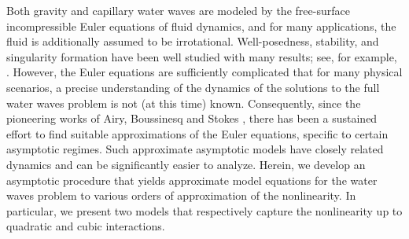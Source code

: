 \documentclass[11pt]{article}
\theoremstyle{plain}
\theoremstyle{definition}
\theoremstyle{definition}
\begin{document}
Both gravity and capillary 
water waves are modeled by the free-surface incompressible Euler equations of fluid dynamics, and for many applications,  the fluid is
additionally assumed to be  irrotational.  Well-posedness, stability, and  singularity formation have been well studied with many results;
 see, for example,  \cite{nalimov1974cauchy,yosihara1982gravity, Craig:existence-theory-water-waves, Beale-Hou-Lowengrub:convergence-boundary-integral, 
 Ambrose-Masmoudi:zero-surface-tension-2d-waterwaves,Wu:well-posedness-water-waves-2d, Wu:almost-global-wellposedness-2d,
  Wu:global-wellposedness-3d, AlvarezSamaniego-Lannes:large-time-existence-water-waves, Lannes1, Lindblad:well-posedness-motion, 
  Coutand-Shkoller:well-posedness-free-surface-incompressible, shatah2011local, ChCoSh2008, ChCoSh2010, alazard2014cauchy, hunter2016two, 
  Germain-Masmoudi-Shatah:global-solutions-gravity-water-waves-annals, ionescu2015global, ifrim2014two, alazard2015global, 
  castro2012splashannals, coutand2014finite, FeIoLi2016,CoSh2016, deng2016global}.
  However, the Euler equations are sufficiently complicated that for many physical scenarios, a precise 
  understanding of the dynamics of the solutions to the full water waves problem is not (at this time) known.    Consequently, 
since the pioneering works of Airy, Boussinesq and Stokes \cite{airy1841tides, Bo1872, Bo1877,stokes1847theory},  there has been a sustained effort to find
suitable  approximations of the Euler equations,  specific  to certain asymptotic regimes.  Such approximate asymptotic models have closely
related dynamics and can be significantly easier to analyze.  Herein, we develop an asymptotic procedure that yields approximate model
equations for the water waves problem to various orders of approximation of the nonlinearity.   In particular, we present two models that 
respectively capture the nonlinearity up to 
 quadratic and cubic interactions.

 
\end{document}

